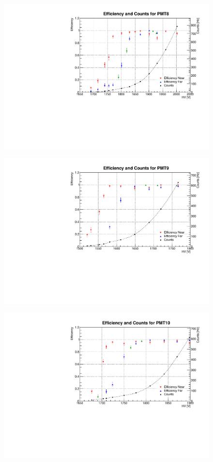 \begin{figure}[h]
	\centerline{\includegraphics[scale=0.8]{img/eff8.pdf}}
\end{figure}
\begin{figure}[h]
	\centerline{\includegraphics[scale=0.8]{img/eff9.pdf}}
\end{figure}
\begin{figure}[h]
	\centerline{\includegraphics[scale=0.8]{img/eff10.pdf}}
\end{figure}
